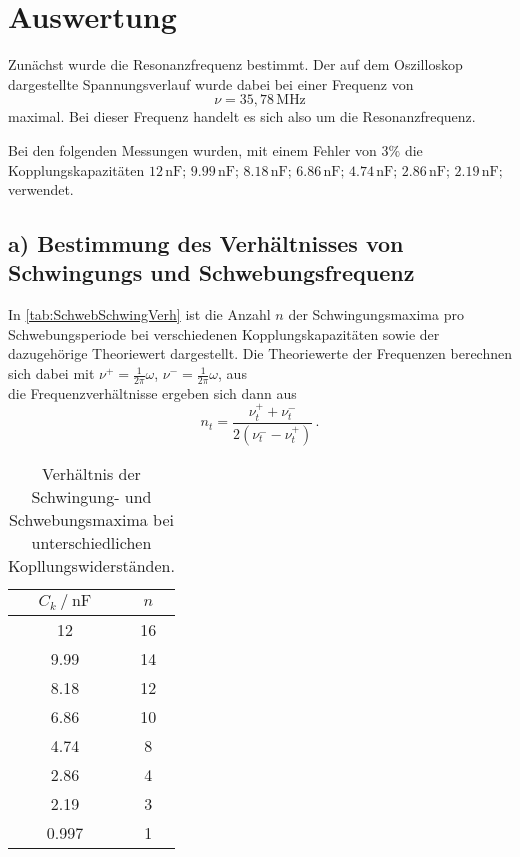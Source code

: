 \section{Auswertung}
\label{sec:Auswertung}


Zunächst wurde die Resonanzfrequenz bestimmt. Der auf dem Oszilloskop dargestellte Spannungsverlauf wurde dabei bei
einer Frequenz von 
\begin{equation*}
    ν = 35,78 \, \unit{\mega\hertz}
\end{equation*} maximal. Bei dieser Frequenz handelt es sich also um die Resonanzfrequenz.

Bei den folgenden Messungen wurden, mit einem Fehler von $3\%$ die Kopplungskapazitäten $12 \,\unit{\nano\farad};\, 9.99 \,\unit{\nano\farad};\, 
8.18 \,\unit{\nano\farad};\, 6.86 \,\unit{\nano\farad};\, 4.74 \,\unit{\nano\farad};\, 2.86 \,\unit{\nano\farad};\, 2.19 \,\unit{\nano\farad};\,$
verwendet. 

\subsection{a) Bestimmung des Verhältnisses von Schwingungs und Schwebungsfrequenz}
\label{subsec:a}

In \autoref{tab:SchwebSchwingVerh} ist die Anzahl $n$ der Schwingungsmaxima pro Schwebungsperiode bei 
verschiedenen Kopplungskapazitäten sowie der dazugehörige Theoriewert dargestellt.
Die Theoriewerte der Frequenzen berechnen sich dabei mit $ν^+ = \frac{1}{2π}ω$, $ν^-=\frac{1}{2π}ω$,  aus
\begin{equation*}
    
\end{equation*}
die Frequenzverhältnisse ergeben sich dann aus
\begin{equation*}
    n_t= \frac{ν^+_t + ν^-_t}{2(ν^-_t - ν^+_t)} \,.
\end{equation*}

\begin{table}[H]
    \centering
    \begin{tabular}{S[table-format=1.3] S}
        \toprule
        {$C_k \mathbin{/} \unit{\nano\farad}$} & {$n$} \\
                 &         16 \\
        9.99       &         14 \\
        8.18       &         12 \\
        6.86       &         10 \\  
        4.74       &         8  \\
        2.86       &         4  \\
        2.19       &         3  \\
        0.997      &         1  \\
        \bottomrule
    \end{tabular}
    \caption{Verhältnis der Schwingung- und Schwebungsmaxima bei unterschiedlichen Kopllungswiderständen.}
    \label{tab:SchwebSchwingVerh}
\end{table}

